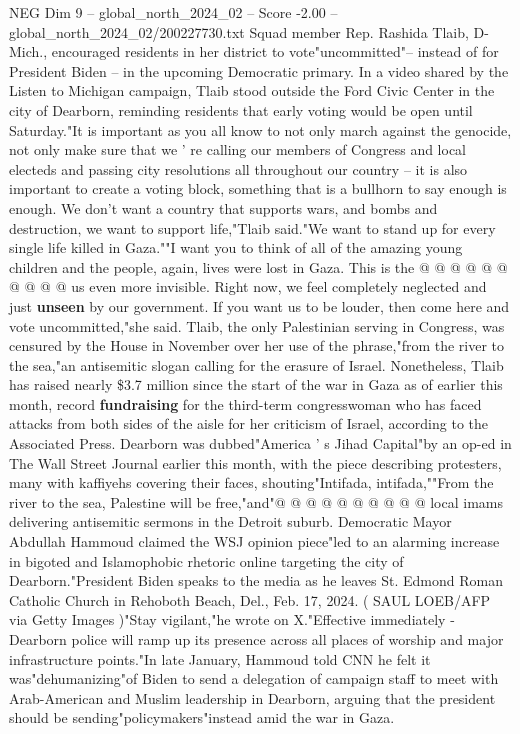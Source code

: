 \begin{textsample}{NEG Dim 9 – global\_north\_2024\_02 – Score -2.00 – global\_north\_2024\_02/200227730.txt}  \label{ex:f9_neg_243}
Squad member Rep.
Rashida Tlaib, D-Mich., encouraged residents in her district to vote"uncommitted"-- instead of for President Biden -- in the upcoming Democratic primary.
In a video shared by the Listen to Michigan campaign, Tlaib stood outside the Ford Civic Center in the city of Dearborn, reminding residents that early voting would be open until Saturday."It is important as you all know to not only march against the genocide, not only make sure that we ' re calling our members of Congress and local electeds and passing city resolutions all throughout our country -- it is also important to create a voting block, something that is a bullhorn to say enough is enough.
We don't want a country that supports wars, and bombs and destruction, we want to support life,"Tlaib said."We want to stand up for every single life killed in Gaza.""I want you to think of all of the amazing young children and the people, again, lives were lost in Gaza.
This is the @ @ @ @ @ @ @ @ @ @ us even more invisible.
Right now, we feel completely neglected and just \textbf{unseen} by our government.
If you want us to be louder, then come here and vote uncommitted,"she said.
Tlaib, the only Palestinian serving in Congress, was censured by the House in November over her use of the phrase,"from the river to the sea,"an antisemitic slogan calling for the erasure of Israel.
Nonetheless, Tlaib has raised nearly \$3.7 million since the start of the war in Gaza as of earlier this month, record \textbf{fundraising} for the third-term congresswoman who has faced attacks from both sides of the aisle for her criticism of Israel, according to the Associated Press.
Dearborn was dubbed"America ' s Jihad Capital"by an op-ed in The Wall Street Journal earlier this month, with the piece describing protesters, many with kaffiyehs covering their faces, shouting"Intifada, intifada,""From the river to the sea, Palestine will be free,"and"@ @ @ @ @ @ @ @ @ @ local imams delivering antisemitic sermons in the Detroit suburb.
Democratic Mayor Abdullah Hammoud claimed the WSJ opinion piece"led to an alarming increase in bigoted and Islamophobic rhetoric online targeting the city of Dearborn."President Biden speaks to the media as he leaves St.
Edmond Roman Catholic Church in Rehoboth Beach, Del., Feb. 17, 2024. ( SAUL LOEB/AFP via Getty Images )"Stay vigilant,"he wrote on X."Effective immediately - Dearborn police will ramp up its presence across all places of worship and major infrastructure points."In late January, Hammoud told CNN he felt it was"dehumanizing"of Biden to send a delegation of campaign staff to meet with Arab-American and Muslim leadership in Dearborn, arguing that the president should be sending"policymakers"instead amid the war in Gaza.

\end{textsample}
